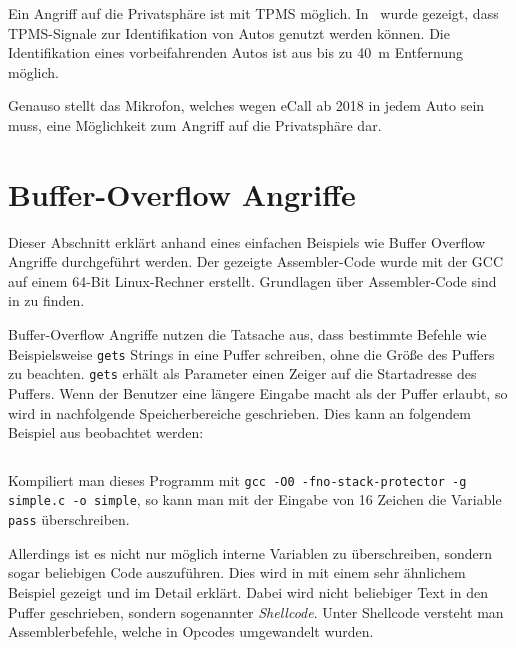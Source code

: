 Ein Angriff auf die Privatsphäre ist mit TPMS möglich. In~\cite{Rouf2010} wurde
gezeigt, dass TPMS-Signale zur Identifikation von Autos genutzt werden können.
Die Identifikation eines vorbeifahrenden Autos ist aus bis zu \SI{40}{\meter}
Entfernung möglich.

Genauso stellt das Mikrofon, welches wegen eCall ab 2018 in jedem Auto sein
muss, eine Möglichkeit zum Angriff auf die Privatsphäre dar.


\section{Buffer-Overflow Angriffe}
Dieser Abschnitt erklärt anhand eines einfachen Beispiels wie Buffer Overflow
Angriffe durchgeführt werden. Der gezeigte Assembler-Code wurde mit der GCC auf
einem 64-Bit Linux-Rechner erstellt. Grundlagen über Assembler-Code sind in
\cite{Albert2012} zu finden.

Buffer-Overflow Angriffe nutzen die Tatsache aus, dass bestimmte Befehle wie
Beispielsweise \verb+gets+ Strings in eine Puffer schreiben, ohne die Größe des
Puffers zu beachten. \verb+gets+ erhält als Parameter einen Zeiger auf die
Startadresse des Puffers. Wenn der Benutzer eine längere Eingabe macht als der
Puffer erlaubt, so wird in nachfolgende Speicherbereiche geschrieben. Dies kann
an folgendem Beispiel aus \cite{Arora2013} beobachtet werden:

\inputminted[linenos, numbersep=5pt, tabsize=4, frame=lines, label=simple.c]{c}{content/exploit-buffer-overflow/simple.c}

Kompiliert man dieses Programm mit
\verb+gcc -O0 -fno-stack-protector -g simple.c -o simple+, so kann man mit der
Eingabe von 16 Zeichen die Variable \verb+pass+ überschreiben.

Allerdings ist es nicht nur möglich interne Variablen zu überschreiben, sondern
sogar beliebigen Code auszuführen. Dies wird in \cite{Mixter} mit einem sehr
ähnlichem Beispiel gezeigt und im Detail erklärt. Dabei wird nicht beliebiger
Text in den Puffer geschrieben, sondern sogenannter \textit{Shellcode}. Unter
Shellcode versteht man Assemblerbefehle, welche in Opcodes umgewandelt wurden.





